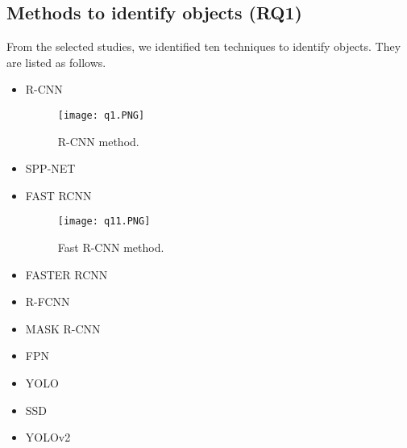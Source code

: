 \documentclass[two column]{ieeeaccess}
\begin{document}
\subsection{Methods to identify objects (RQ1)}
From the selected studies, we identified ten techniques to identify objects. They are listed as follows.
\begin{itemize}

    \item R-CNN
    
    \begin{figure}[h]
    \centering
    \texttt{[image: q1.PNG]}
    \caption{R-CNN method.}
    \label{fig12}
    \end{figure}
    
    \item SPP-NET
    
    \item FAST RCNN
    
    \begin{figure}[h]
    \centering
    \texttt{[image: q11.PNG]}
    \caption{Fast R-CNN method.}
    \label{fig13}
    \end{figure}
    
    \item FASTER RCNN
    
    \item R-FCNN
    
    \item MASK R-CNN
    
    \item FPN
    
    \item YOLO
    
    \item SSD
    
    \item YOLOv2
    
\end{itemize}
\end{document}
